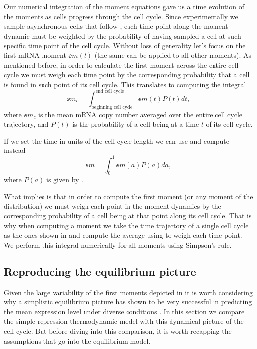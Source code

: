Our numerical integration of the moment equations gave us a time evolution of
the moments as cells progress through the cell cycle. Since experimentally we
sample asynchronous cells that follow , each time point along
the moment dynamic must be weighted by the probability of having sampled a cell
at such specific time point of the cell cycle. Without loss of generality let's
focus on the first mRNA moment $\ee{m(t)}$ (the same can be applied to all other
moments). As mentioned before, in order to calculate the first moment across the
entire cell cycle we must weigh each time point by the corresponding probability
that a cell is found in such point of its cell cycle. This translates to
computing the integral
\begin{equation}
  \ee{m}_c = \int_{\text{beginning cell cycle}}^{\text{end cell cycle}}
                       \ee{m(t)} P(t) dt,
\end{equation}
where $\ee{m}_c$ is the mean mRNA copy number averaged over the entire cell
cycle trajectory, and $P(t)$ is the probability of a cell being at a time $t$ of
its cell cycle.

If we set the time in units of the cell cycle length we can use
 and compute instead
\begin{equation}
  \ee{m} = \int_0^1 \ee{m(a)} P(a) da,
  \label{seq_moment_avg}
\end{equation}
where $P(a)$ is given by .

What  implies is that in order to compute the first moment
(or any moment of the distribution) we must weigh each point in the moment
dynamics by the corresponding probability of a cell being at that point along
its cell cycle. That is why when computing a moment we take the time trajectory
of a single cell cycle as the ones shown in  and
compute the average using  to weigh each time point. We
perform this integral numerically for all moments using Simpson's rule.

\subsection{Reproducing the equilibrium picture}

Given the large variability of the first moments depicted in
 it is worth considering why a simplistic
equilibrium picture has shown to be very successful in predicting the mean
expression level under diverse conditions \cite{Garcia2011c, Brewster2014,
Barnes2019, Razo-Mejia2018}. In this section we compare the simple repression
thermodynamic model with this dynamical picture of the cell cycle. But before
diving into this comparison, it is worth recapping the assumptions that go into
the equilibrium model.

